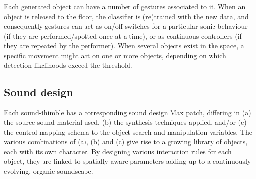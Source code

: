 Each generated object can have a number of gestures associated to it. When an object is released to the floor, the classifier is (re)trained with the new data, and consequently gestures can act as on/off switches for a particular sonic behaviour (if they are performed/spotted once at a time), or as continuous controllers (if they are repeated by the performer). When several objects exist in the space, a specific movement might act on one or more objects, depending on which detection likelihoods exceed the threshold. 


\subsection{Sound design}


Each sound-thimble has a corresponding sound design Max patch, differing in (a) the source sound material used, (b) the synthesis techniques applied, and/or (c) the control mapping schema to the object search and manipulation variables. The various combinations of (a), (b) and (c) give rise to a growing library of objects, each with its own character. By designing various interaction rules for each object, they are linked to spatially aware parameters adding up to a continuously evolving, organic soundscape.



